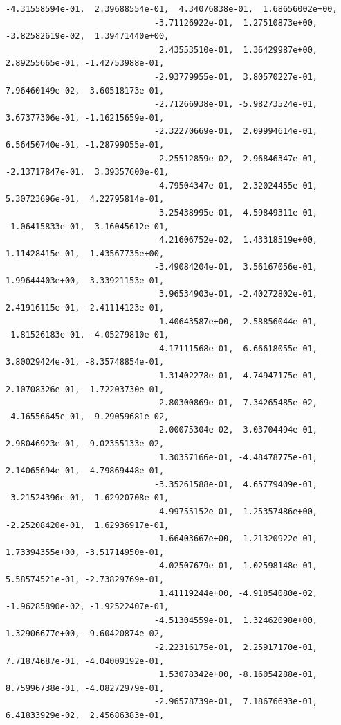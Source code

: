 \documentclass[11pt]{article}
\begin{document}
\begin{Verbatim}[commandchars=\\\{\}]
                              -4.31558594e-01,  2.39688554e-01,  4.34076838e-01,  1.68656002e+00,
                              -3.71126922e-01,  1.27510873e+00, -3.82582619e-02,  1.39471440e+00,
                               2.43553510e-01,  1.36429987e+00,  2.89255665e-01, -1.42753988e-01,
                              -2.93779955e-01,  3.80570227e-01,  7.96460149e-02,  3.60518173e-01,
                              -2.71266938e-01, -5.98273524e-01,  3.67377306e-01, -1.16215659e-01,
                              -2.32270669e-01,  2.09994614e-01,  6.56450740e-01, -1.28799055e-01,
                               2.25512859e-02,  2.96846347e-01, -2.13717847e-01,  3.39357600e-01,
                               4.79504347e-01,  2.32024455e-01,  5.30723696e-01,  4.22795814e-01,
                               3.25438995e-01,  4.59849311e-01, -1.06415833e-01,  3.16045612e-01,
                               4.21606752e-02,  1.43318519e+00,  1.11428415e-01,  1.43567735e+00,
                              -3.49084204e-01,  3.56167056e-01,  1.99644403e+00,  3.33921153e-01,
                               3.96534903e-01, -2.40272802e-01,  2.41916115e-01, -2.41114123e-01,
                               1.40643587e+00, -2.58856044e-01, -1.81526183e-01, -4.05279810e-01,
                               4.17111568e-01,  6.66618055e-01,  3.80029424e-01, -8.35748854e-01,
                              -1.31402278e-01, -4.74947175e-01,  2.10708326e-01,  1.72203730e-01,
                               2.80300869e-01,  7.34265485e-02, -4.16556645e-01, -9.29059681e-02,
                               2.00075304e-02,  3.03704494e-01,  2.98046923e-01, -9.02355133e-02,
                               1.30357166e-01, -4.48478775e-01,  2.14065694e-01,  4.79869448e-01,
                              -3.35261588e-01,  4.65779409e-01, -3.21524396e-01, -1.62920708e-01,
                               4.99755152e-01,  1.25357486e+00, -2.25208420e-01,  1.62936917e-01,
                               1.66403667e+00, -1.21320922e-01,  1.73394355e+00, -3.51714950e-01,
                               4.02507679e-01, -1.02598148e-01,  5.58574521e-01, -2.73829769e-01,
                               1.41119244e+00, -4.91854080e-02, -1.96285890e-02, -1.92522407e-01,
                              -4.51304559e-01,  1.32462098e+00,  1.32906677e+00, -9.60420874e-02,
                              -2.22316175e-01,  2.25917170e-01,  7.71874687e-01, -4.04009192e-01,
                               1.53078342e+00, -8.16054288e-01,  8.75996738e-01, -4.08272979e-01,
                              -2.96578739e-01,  7.18676693e-01,  6.41833929e-02,  2.45686383e-01,

\end{Verbatim}
\end{document}
